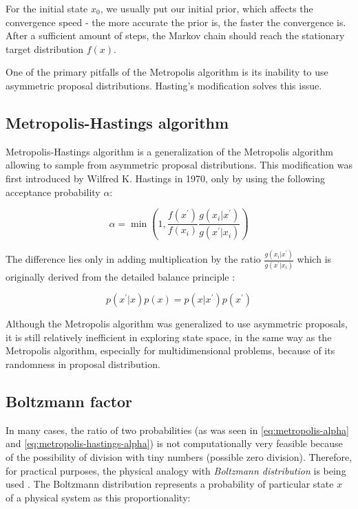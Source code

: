 \documentclass[
  digital, %
  oneside, %
  lof,     %
  lot,     %
]{fithesis4}
\begin{document}
For the initial state $x_0$, we usually put our initial prior, which affects the convergence speed - the more accurate the prior is, the faster the convergence is.
After a sufficient amount of steps, the Markov chain should reach the stationary target distribution $f(x)$.

One of the primary pitfalls of the Metropolis algorithm is its inability to use asymmetric proposal distributions.
Hasting's modification solves this issue.


\subsection{Metropolis-Hastings algorithm}

Metropolis-Hastings algorithm is a generalization of the Metropolis algorithm allowing to sample from asymmetric proposal distributions.
This modification was first introduced by Wilfred K. Hastings in 1970, only by using the following acceptance probability $\alpha$:

\begin{equation}\label{eq:metropolis-hastings-alpha}
  \alpha = \min \left(1, \frac{f(x^{\prime})}{f(x_{i})} \frac{g(x_{i} | x^{\prime})}{g(x^{\prime} | x_{i})}\right)  
\end{equation}

The difference lies only in adding multiplication by the ratio $\frac{g(x_{i} | x^{\prime})}{g(x^{\prime} | x_{i})}$ which is originally derived from the detailed balance principle \cite[Chapter 11]{owen2013}:

\begin{equation}
  p(x^\prime | x) p(x) = p(x | x^\prime) p(x^\prime)
\end{equation}

Although the Metropolis algorithm was generalized to use asymmetric proposals, it is still relatively inefficient in exploring state space, in the same way as the Metropolis algorithm, especially for multidimensional problems, because of its randomness in proposal distribution.


\subsection{Boltzmann factor}
\label{sec:boltzmann-factor}

In many cases, the ratio of two probabilities (as was seen in \eqref{eq:metropolis-alpha} and \eqref{eq:metropolis-hastings-alpha}) is not computationally very feasible because of the possibility of division with tiny numbers (possible zero division).
Therefore, for practical purposes, the physical analogy with \textit{Boltzmann distribution} is being used \cite{murphy2021}.
The Boltzmann distribution represents a probability of particular state $x$ of a physical system as this proportionality:
\end{document}
